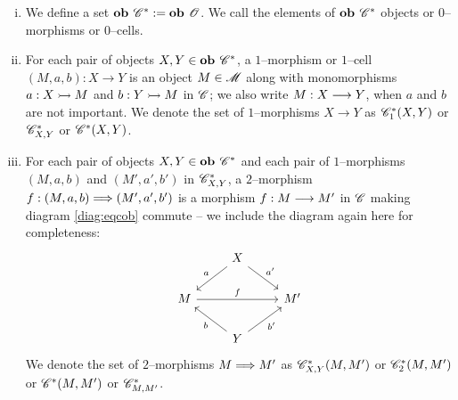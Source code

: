 \documentclass[./Thick_TQFTs_and_Quantum_Information.tex]{subfiles}
\begin{document}
\begin{enumerate}[(i)]

\item We define a set $\textbf{ob } \mathscr{C}^* := \textbf{ob } \mathscr{O}$. We call the elements
of $\textbf{ob } \mathscr{C}^*$ objects or $0$--morphisms or $0$--cells.

\item For each pair of objects $X, Y \in \textbf{ob } \mathscr{C}^*$, a $1$--morphism or
$1$--cell $(M, a, b) : X \to Y$ is an object $M \in \mathscr{M}$ along with
monomorphisms $a : X \stackrel{}{\rightarrowtail} M$ and $b : Y \stackrel{}{\rightarrowtail} M$ in $\mathscr{C}$; we also write
$M : X \stackrel{}{\longrightarrow} Y$, when $a$ and $b$ are not important. We denote the set of
$1$--morphisms $X \to Y$ as $\mathscr{C}^*_1(X, Y)$ or $\mathscr{C}^*_{X, Y}$ or
$\mathscr{C}^*(X, Y)$.

\item For each pair of objects $X, Y \in \textbf{ob } \mathscr{C}^*$ and each pair of
$1$--morphisms $(M, a, b)$ and $(M', a', b')$ in $\mathscr{C}^*_{X, Y}$, a
$2$--morphism $f : (M, a, b) \stackrel{}{\Longrightarrow} (M', a', b')$ is a morphism $f : M \stackrel{}{\longrightarrow} M'$ in
$\mathscr{C}$ making diagram \eqref{diag:eqcob} commute -- we include the diagram
again here for completeness:
\[\begin{tikzcd}
  & X \arrow[dl, "a" above left] \arrow[dr, "a'" above right] & \\
  M \arrow[rr, "f" above] &
  & M' \\
  & Y \arrow[ul, "b" below left] \arrow[ur, "b'" below right] &
\end{tikzcd}\]
We denote the set of
$2$--morphisms $M \stackrel{}{\Longrightarrow} M'$ as $\mathscr{C}^*_{X, Y}(M, M')$ or $\mathscr{C}^*_2(M, M')$ or
$\mathscr{C}^*(M, M')$ or $\mathscr{C}^*_{M, M'}$.


\end{enumerate}
\end{document}
